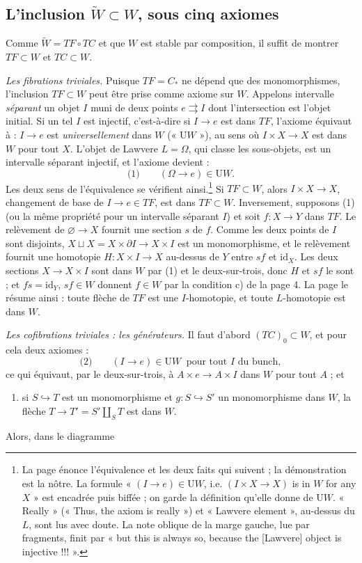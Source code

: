 \documentclass[11pt,a4paper]{article}
\begin{document}
\subsection*{L'inclusion $\widetilde W \subset W$, sous cinq axiomes}

Comme $\widetilde W = TF \circ TC$ et que $W$ est stable par composition, il
suffit de montrer $TF \subset W$ et $TC \subset W$.

\emph{Les fibrations triviales.} Puisque $TF = C_*$ ne dépend que des
monomorphismes, l'inclusion $TF \subset W$ peut être prise comme axiome sur
$W$. Appelons intervalle \emph{séparant} un objet $I$ muni de deux points
$e \rightrightarrows I$ dont l'intersection est l'objet initial. Si un tel $I$
est injectif, c'est-à-dire si $I \to e$ est dans $TF$, l'axiome équivaut à :
$I \to e$ est \emph{universellement} dans $W$ (« $\mathrm{U}W$ »), au sens où
$I \times X \to X$ est dans $W$ pour tout $X$. L'objet de Lawvere $L =
\Omega$, qui classe les sous-objets, est un intervalle séparant injectif, et
l'axiome devient :
\[
\text{(1)} \qquad (\Omega \to e) \in \mathrm{U}W .
\]
Les deux sens de l'équivalence se vérifient ainsi.\footnote{La page énonce
l'équivalence et les deux faits qui suivent ; la démonstration est la nôtre.
La formule « $(I \to e) \in \mathrm{U}W$, i.e. $(I \times X \to X)$ is in
$W$ for any $X$ » est encadrée puis biffée ; on garde la définition qu'elle
donne de $\mathrm{U}W$. « Really » (« Thus, the axiom is really ») et
« Lawvere element », au-dessus du $L$, sont lus avec doute. La note oblique de
la marge gauche, lue par fragments, finit par « but this is always so, because
the [Lawvere] object is injective !!! ».} Si $TF \subset W$, alors $I \times X
\to X$, changement de base de $I \to e \in TF$, est dans $TF \subset W$.
Inversement, supposons (1) (ou la même propriété pour un intervalle séparant
$I$) et soit $f : X \to Y$ dans $TF$. Le relèvement de $\varnothing \to X$
fournit une section $s$ de $f$. Comme les deux points de $I$ sont disjoints,
$X \sqcup X = X \times \partial I \to X \times I$ est un monomorphisme, et le
relèvement fournit une homotopie $H : X \times I \to X$ au-dessus de $Y$
entre $sf$ et $\mathrm{id}_X$. Les deux sections $X \to X \times I$ sont dans
$W$ par (1) et le deux-sur-trois, donc $H$ et $sf$ le sont ; et $fs =
\mathrm{id}_Y$, $sf \in W$ donnent $f \in W$ par la condition c) de la page
4. La page le résume ainsi : toute flèche de $TF$ est une $I$-homotopie,
et toute $L$-homotopie est dans $W$.

\emph{Les cofibrations triviales : les générateurs.} Il faut d'abord
$(TC)_0 \subset W$, et pour cela deux axiomes :
\[
\text{(2)} \qquad (I \to e) \in \mathrm{U}W \ \text{ pour tout } I \text{ du
bunch},
\]
ce qui équivaut, par le deux-sur-trois, à $A \times e \to A \times I$ dans $W$
pour tout $A$ ; et
\begin{enumerate}
\item[(3)] si $S \hookrightarrow T$ est un monomorphisme et
$g : S \hookrightarrow S'$ un monomorphisme dans $W$, la flèche
$T \to T' = S' \amalg_S T$ est dans $W$.
\end{enumerate}
Alors, dans le diagramme
\end{document}
